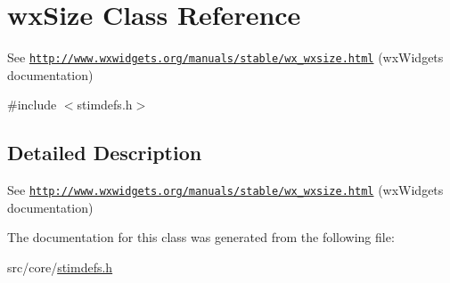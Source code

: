 \hypertarget{classwxSize}{
\section{wxSize Class Reference}
\label{classwxSize}
}


See \href{http://www.wxwidgets.org/manuals/stable/wx_wxsize.html}{\tt http://www.wxwidgets.org/manuals/stable/wx\_\-wxsize.html} (wxWidgets documentation)  




{\ttfamily \#include $<$stimdefs.h$>$}



\subsection{Detailed Description}
See \href{http://www.wxwidgets.org/manuals/stable/wx_wxsize.html}{\tt http://www.wxwidgets.org/manuals/stable/wx\_\-wxsize.html} (wxWidgets documentation) 

The documentation for this class was generated from the following file:\begin{DoxyCompactItemize}
\item 
src/core/\hyperlink{stimdefs_8h}{stimdefs.h}\end{DoxyCompactItemize}
